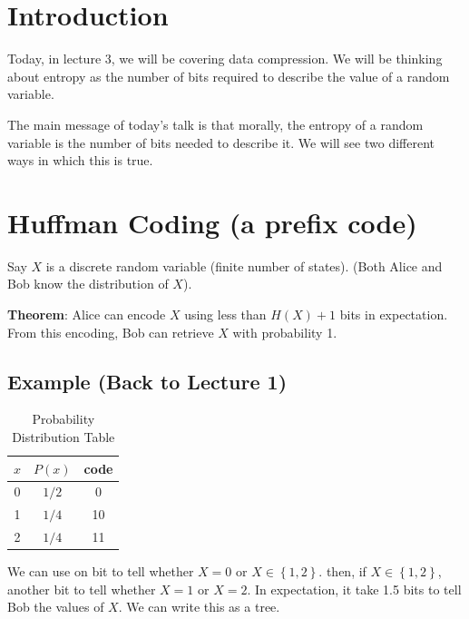 \documentclass{article}
\begin{document}
\section{Introduction}

Today, in lecture 3, we will be covering data compression. We will be thinking about entropy as the number of bits required to describe the value of a random variable.

The main message of today's talk is that morally, the entropy of a random variable is the number of bits needed to describe it. We will see two different ways in which this is true.

\section{Huffman Coding (a prefix code)}

Say $X$ is a discrete random variable (finite number of states). (Both Alice and Bob know the distribution of $X$).

\textbf{Theorem}: Alice can encode $X$ using less than $H(X)+1$ bits in expectation. From this encoding, Bob can retrieve $X$ with probability 1.

\subsection{Example (Back to Lecture 1)}

\begin{table}[h]
\centering
\begin{tabular}{|c|c|c|}
\hline
$x$ & $P(x)$ & code \\ \hline
0   & $1/2$ & 0 \\ \hline
1   & $1/4$ & 10 \\ \hline
2   & $1/4$ & 11 \\ \hline
\end{tabular}
\caption{Probability Distribution Table}
\label{tab:prob_dist}
\end{table}

We can use on bit to tell whether $X=0$ or $X\in\left\{1,2\right\}$. then, if $X\in\left\{1,2\right\}$, another bit to tell whether $X=1$ or $X=2$. In expectation, it take 1.5 bits to tell Bob the values of $X$. We can write this as a tree.

\end{document}
